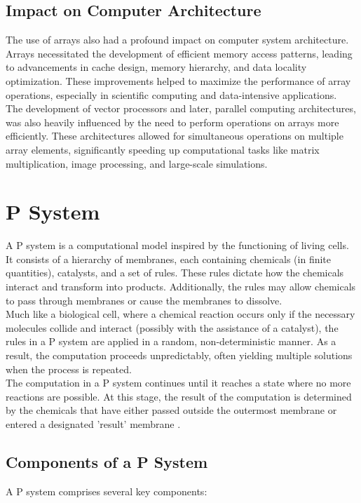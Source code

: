 \documentclass[12pt, oneside]{book}
\begin{document}
	\subsection{Impact on Computer Architecture}
The use of arrays also had a profound impact on computer system architecture. Arrays necessitated the development of efficient memory access patterns, leading to advancements in cache design, memory hierarchy, and data locality optimization. These improvements helped to maximize the performance of array operations, especially in scientific computing and data-intensive applications.\\The development of vector processors and later, parallel computing architectures, was also heavily influenced by the need to perform operations on arrays more efficiently. These architectures allowed for simultaneous operations on multiple array elements, significantly speeding up computational tasks like matrix multiplication, image processing, and large-scale simulations.

\section{P System}
A P system is a computational model inspired by the functioning of living cells. It consists of a hierarchy of membranes, each containing chemicals (in finite quantities), catalysts, and a set of rules. These rules dictate how the chemicals interact and transform into products. Additionally, the rules may allow chemicals to pass through membranes or cause the membranes to dissolve.\\Much like a biological cell, where a chemical reaction occurs only if the necessary molecules collide and interact (possibly with the assistance of a catalyst), the rules in a P system are applied in a random, non-deterministic manner. As a result, the computation proceeds unpredictably, often yielding multiple solutions when the process is repeated.\\The computation in a P system continues until it reaches a state where no more reactions are possible. At this stage, the result of the computation is determined by the chemicals that have either passed outside the outermost membrane or entered a designated 'result' membrane \cite{PsystemResults}.

\subsection{Components of a P System}
A P system comprises several key components:
\end{document}
